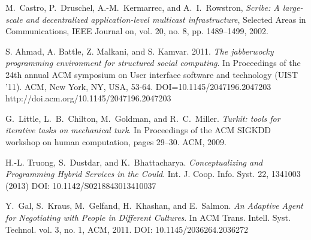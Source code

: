\begin{thebibliography}{1}
M.~Castro, P.~Druschel, A.-M.~Kermarrec, and A.~I.~Rowstron, \emph{Scribe: A large-scale and decentralized application-level multicast infrastructure}, Selected Areas in Communications, IEEE Journal on, vol. 20, no. 8, pp. 1489–1499, 2002.

S. Ahmad, A. Battle, Z. Malkani, and S. Kamvar. 2011. \emph{The jabberwocky programming environment for structured social computing}. In Proceedings of the 24th annual ACM symposium on User interface software and technology (UIST '11). ACM, New York, NY, USA, 53-64. DOI=10.1145/2047196.2047203 http://doi.acm.org/10.1145/2047196.2047203

G.~Little, L.~B.~Chilton, M.~Goldman, and R.~C.~Miller. \emph{Turkit: tools for iterative tasks on mechanical turk}. In Proceedings of the ACM SIGKDD workshop on human computation, pages 29–30. ACM, 2009.

 H.-L. Truong, S.~Dustdar, and K.~Bhattacharya. \emph{Conceptualizing and Programming Hybrid Services in the Could}. Int. J. Coop. Info. Syst. 22, 1341003 (2013) DOI: 10.1142/S0218843013410037

Y.~Gal, S.~Kraus, M.~Gelfand, H.~Khashan, and E.~Salmon. \emph{An Adaptive Agent for Negotiating with People in Different Cultures}. In  ACM Trans. Intell. Syst. Technol. vol. 3, no. 1, ACM, 2011. DOI: 10.1145/2036264.2036272

\end{thebibliography}









